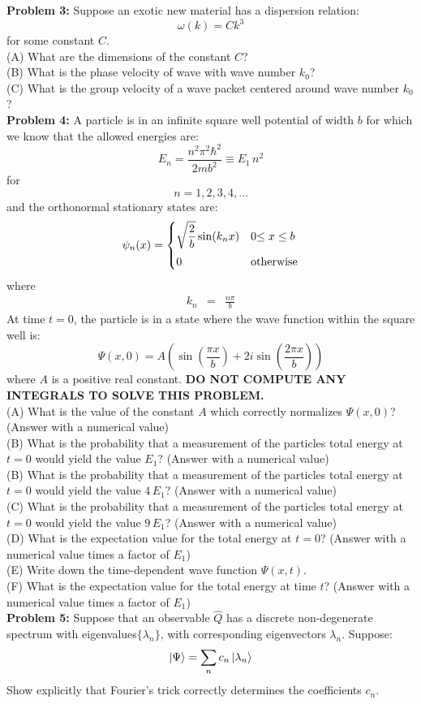 \documentclass[12pt]{article}
\begin{document}
\noindent
{\bf Problem 3:} 
Suppose an exotic new material has a dispersion relation:
$$\omega(k) = C k^3$$
for some constant $C$.\\[5pt]
(A) What are the dimensions of the constant $C$?\\[5pt]
(B) What is the phase velocity of wave with wave number $k_0$?\\[5pt]
(C) What is the group velocity of a wave packet centered around wave number $k_0$?\\[5pt]


\noindent
{\bf Problem 4:}
A particle is in an infinite square well potential of width $b$ for which we know that the allowed energies are:
$$E_n = \frac{n^2 \pi^2 \hbar^2}{2mb^2} \equiv E_1 \, n^2$$
for
$$n=1,2,3,4,\ldots$$
and the orthonormal stationary states are:
$$
\psi_n(x) = 
\begin{cases}    
   {\displaystyle \sqrt{\frac{2}{b}}\sin(k_n x)} & 0 {\displaystyle \leq x \leq b} \\[8pt]
   0 & {\rm otherwise} \\
\end{cases}   
$$
where
\begin{eqnarray*}
k_n&=&\frac{n\pi}{b}
\end{eqnarray*}
At time $t=0$, the particle is in a state where the wave function within the square well is:
$$\Psi(x,0) = A\left( \sin\left(\frac{\pi x}{b}\right) + 2i \sin\left(\frac{2 \pi x}{b}\right) \right)$$
where $A$ is a positive real constant.  {\bf DO NOT COMPUTE ANY INTEGRALS TO SOLVE THIS PROBLEM.}\\[5pt]

\noindent
(A) What is the value of the constant $A$ which correctly normalizes $\Psi(x,0)$? (Answer with a numerical value)\\[8pt]
(B) What is the probability that a measurement of the particles total energy at $t=0$ would yield the value $E_1$? (Answer with a numerical value)\\[8pt]
(B) What is the probability that a measurement of the particles total energy at $t=0$ would yield the value $4\,E_1$? (Answer with a numerical value)\\[8pt]
(C) What is the probability that a measurement of the particles total energy at $t=0$ would yield the value $9\,E_1$? (Answer with a numerical value)\\[8pt]
(D) What is the expectation value for the total energy at $t=0$?  (Answer with a numerical value times a factor of $E_1$)\\[8pt]
(E) Write down the time-dependent wave function $\Psi(x,t)$.\\[8pt]
(F) What is the expectation value for the total energy at time $t$?  (Answer with a numerical value times a factor of $E_1$)\\[8pt]


\noindent
{\bf Problem 5:}  Suppose that an observable $\hat{Q}$ has a discrete non-degenerate spectrum with eigenvalues$\{\lambda_n\}$, with corresponding eigenvectors $\lambda_{n}$.  Suppose:
$$\ket{\Psi} = \sum_n c_n \ket{\lambda_n}$$
Show explicitly that Fourier's trick correctly determines the coefficients $c_n$.
\end{document}

